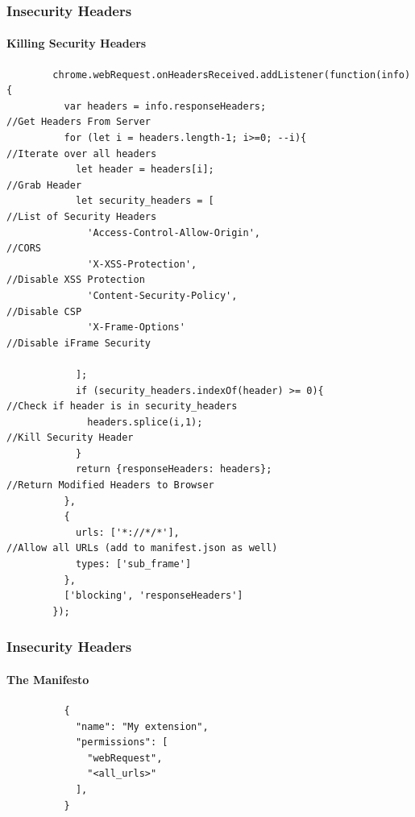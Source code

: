 \documentclass[aspectratio=169]{beamer}
\begin{document}
\begin{frame}[fragile]{}
  \frametitle{Insecurity Headers}
  \framesubtitle{Killing Security Headers}
  \begin{center}
    \begin{tcolorbox}[title=headers.js,colback=black]
    \begin{minipage}{0.5\textwidth}
      \begin{verbatim}
        chrome.webRequest.onHeadersReceived.addListener(function(info){
          var headers = info.responseHeaders;                           //Get Headers From Server
          for (let i = headers.length-1; i>=0; --i){                    //Iterate over all headers
            let header = headers[i];                                    //Grab Header
            let security_headers = [                                    //List of Security Headers
              'Access-Control-Allow-Origin',                            //CORS
              'X-XSS-Protection',                                       //Disable XSS Protection
              'Content-Security-Policy',                                //Disable CSP
              'X-Frame-Options'                                         //Disable iFrame Security
              
            ];
            if (security_headers.indexOf(header) >= 0){                 //Check if header is in security_headers
              headers.splice(i,1);                                      //Kill Security Header
            }
            return {responseHeaders: headers};                          //Return Modified Headers to Browser
          },
          {
            urls: ['*://*/*'],                                          //Allow all URLs (add to manifest.json as well)
            types: ['sub_frame']
          },
          ['blocking', 'responseHeaders']
        });
      \end{verbatim}
    \end{minipage}
    \end{tcolorbox}
  \end{center}
\end{frame}
\begin{frame}[fragile]{}
  \frametitle{Insecurity Headers}
  \framesubtitle{The Manifesto}
  \begin{center}
    \begin{minipage}{0.5\textwidth}
      \begin{tcolorbox}[title=manifest.json,colback=black]
        \begin{verbatim}
          {
            "name": "My extension",
            "permissions": [
              "webRequest",
              "<all_urls>"
            ],
          }
        \end{verbatim}
      \end{tcolorbox}
    \end{minipage}
  \end{center}
\end{frame}
\end{document}
